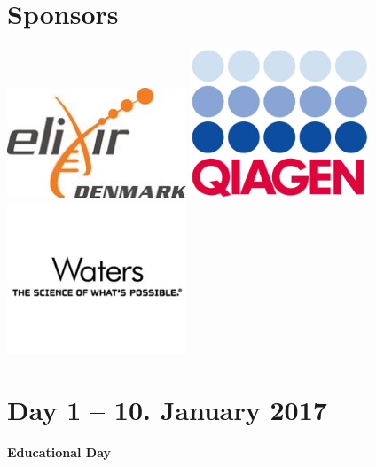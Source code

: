\documentclass[a5paper,11pt,oneside]{article}
\begin{document}
\vspace*{\fill}
\section*{\color{eubicRed} Sponsors}
\begin{center}
  \includegraphics[width=0.4\textwidth]{graphics/elixir.jpg}
  \includegraphics[width=0.4\textwidth]{graphics/qiagen.jpg}
  \includegraphics[width=0.4\textwidth]{graphics/waters.jpg}
\end{center}

\pagebreak
\section*{\color{eubicRed} Day 1 -- 10. January 2017}
\noindent\textbf{Educational Day}
\end{document}
